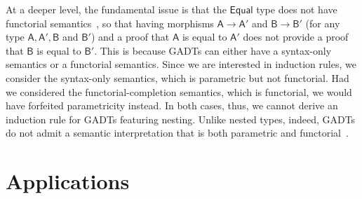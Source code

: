 \documentclass[9pt]{entcs}
\begin{document}
At a deeper level, the fundamental issue is that the $\mathsf{Equal}$
type does not have functorial semantics~\cite{jgj21}, so that having
morphisms $\mathsf{A \to A'}$ and $\mathsf{B \to B'}$ (for any type
$\mathsf{A, A', B}$ and $\mathsf{B'}$) and a proof that $\mathsf{A}$
is equal to $\mathsf{A'}$ does not provide a proof that $\mathsf{B}$
is equal to $\mathsf{B'}$. {\color{red} This is because GADTs can
  either have a syntax-only semantics or a functorial semantics.
  Since we are interested in induction rules, we consider the
  syntax-only semantics, which is parametric but not functorial.  Had
  we considered the functorial-completion semantics, which is
  functorial, we would have forfeited parametricity instead.  In both
  cases, thus, we cannot derive an induction rule for GADTs featuring
  nesting.  Unlike nested types, indeed, GADTs do not admit a semantic
  interpretation that is both parametric and functorial~\cite{jgj21}.}

\section{Applications}\label{sec:app}
\end{document}
